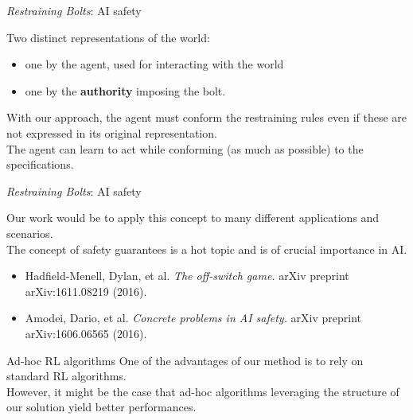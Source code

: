 \documentclass{beamer}
\begin{document}
\begin{frame}{\emph{Restraining Bolts}: AI safety}
	
	Two distinct representations of the world:
	\begin{itemize}
		\item one by the agent, used for interacting with the world
		\item one by the \textbf{authority} imposing the bolt.
	\end{itemize}
	
	\vspace{0.3cm}
	With our approach, the agent must conform the restraining rules even if these are not expressed in its original	representation.\\
	
	\vspace{0.3cm}
	The agent can learn to act while conforming (as much as possible) to the \LLf specifications.\\
	
	
	
\end{frame}

\begin{frame}{\emph{Restraining Bolts}: AI safety}
	
	Our work would be to apply this concept to many different applications and scenarios.\\
	
	\vspace{0.3cm}
	The concept of safety guarantees is a hot topic and is of crucial importance in AI.
	\begin{itemize}
		\item Hadfield-Menell, Dylan, et al. \emph{The off-switch game.} arXiv preprint arXiv:1611.08219 (2016).
		\item Amodei, Dario, et al. \emph{Concrete problems in AI safety.} arXiv preprint arXiv:1606.06565 (2016).
	\end{itemize}
\end{frame}

\begin{frame}{Ad-hoc RL algorithms}
	One of the advantages of our method is to rely on standard RL algorithms.\\
	
	\vspace{0.5cm}
	However, it might be the case that ad-hoc algorithms leveraging the structure of our solution yield better performances.
\end{frame}
\end{document}
